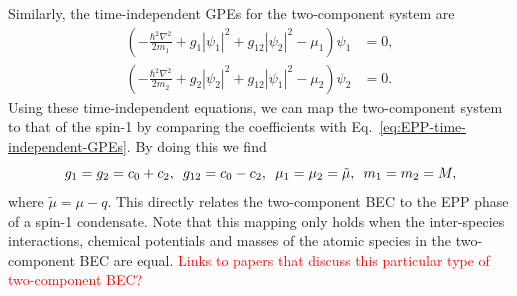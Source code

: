 Similarly, the time-independent GPEs for the two-component system are
\begin{equation}
    \begin{aligned}
        \left(-\frac{\hbar^2\nabla^2}{2m_1} + g_1|\psi_1|^2
        +g_{12}|\psi_2|^2 - \mu_1\right)\psi_1 &= 0, \\
        \left(-\frac{\hbar^2\nabla^2}{2m_2} + g_2|\psi_2|^2
        +g_{12}|\psi_1|^2 - \mu_2\right)\psi_2 &= 0.
    \end{aligned}
    \label{eq:two-comp-time-independent-gpes}
\end{equation}
Using these time-independent equations, we can map the two-component system
to that of the spin-1 by comparing the coefficients with
Eq.~\eqref{eq:EPP-time-independent-GPEs}.
By doing this we find
\begin{equation}
    g_1=g_2=c_0+c_2, \enskip g_{12} = c_0-c_2, \enskip \mu_1=\mu_2=\tilde{\mu}, 
    \enskip m_1=m_2=M,
\end{equation}
where $\tilde{\mu} = \mu - q$.
This directly relates the two-component BEC to the EPP phase of a spin-1
condensate.
Note that this mapping only holds when the inter-species interactions, chemical
potentials and masses of the atomic species in the two-component BEC are equal.
\textcolor{red}{Links to papers that discuss this particular type of
two-component BEC?}


